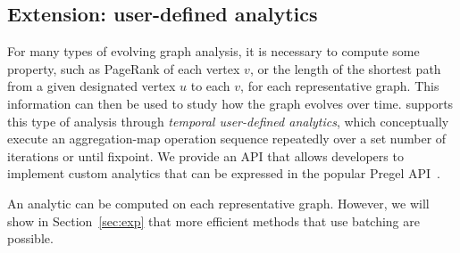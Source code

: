\subsection{Extension: user-defined analytics}
\label{sec:analytics}

For many types of evolving graph analysis, it is necessary to compute
some property, such as PageRank of each vertex $v$, or the length of
the shortest path from a given designated vertex $u$ to each $v$, for
each representative graph.  This information can then be used to study
how the graph evolves over time.  \ql supports this type of analysis
through {\em temporal user-defined analytics}, which conceptually
execute an aggregation-map operation sequence repeatedly over a set
number of iterations or until fixpoint.  We provide an API that allows developers to implement custom
analytics that can be expressed in the popular Pregel
API~\cite{DBLP:conf/sigmod/MalewiczABDHLC10}.

An analytic can be computed on each representative graph.  However, we
will show in Section~\ref{sec:exp} that more efficient methods that
use batching are possible.  
